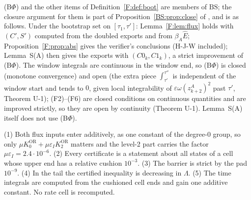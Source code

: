\documentclass[11pt]{article}
\newcommand{\fn}[1]{\texttt{\detokenize{#1}}}
\newcommand{\OR}{\mathrm{OR}}\newcommand{\eI}{\varepsilon_I}
\begin{document}
\begin{remark}\label{F:rem:boot}
(B$\Phi$) and the other items of Definition~\ref{F:def:boot} are members of $\mathrm{BS}$; the closure argument for them is part of Proposition~\ref{BS:prop:close} of \fn{bootstrap_v38.tex}, and is as follows. Under the bootstrap set on $[\tau_1,\tau']$: Lemma~\ref{F:lem:flux} holds with $(C',S')$ computed from the doubled exports and from $\beta_A\hat E$; Proposition~\ref{F:prop:abs} gives the verifier's conclusions (H-J-W included); Lemma~S(A) then gives the exports with $(C0_k,C1_k)$, a strict improvement of (B$\Phi$). The window integrals are continuous in the window end, so (B$\Phi$) is closed (monotone convergence) and open (the extra piece $\int_{\tau'}^{\tau''}$ is independent of the window start and tends to $0$, given local integrability of $\varepsilon\omega(z^A_{k+2})^2$ past $\tau'$, Theorem U-1); (F2)--(F6) are closed conditions on continuous quantities and are improved strictly, so they are open by continuity (Theorem U-1). Lemma~S(A) itself does not use (B$\Phi$).
\end{remark}

\begin{remark}
(1) Both flux inputs enter additively, as one constant of the degree-0 group, so only $\mu K_0^{\OR}+\mu\eI K_2^{\OR}$ matters and the level-2 part carries the factor $\mu\eI=2.4\cdot10^{-6}$. (2) Every certificate is a statement about all states of a cell whose upper end has a relative cushion $10^{-3}$. (3) The barrier is strict by the pad $10^{-9}$. (4) In the tail the certified inequality is decreasing in $\Lambda$. (5) The time integrals are computed from the cushioned cell ends and gain one additive constant. No rate cell is recomputed.
\end{remark}
\end{document}
